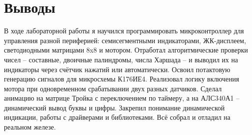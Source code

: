 \documentclass[oneside,a4paper,14pt]{extarticle} %
\begin{document}
	\section*{Выводы}
	В ходе лабораторной работы я научился программировать микроконтроллер для управления разной периферией: семисегментными индикаторами, ЖК-дисплеем, светодиодными матрицами 8x8 и мотором. Отработал алгоритмические проверки чисел – составные, двоичные палиндромы, числа Харшада – и выводил их на индикаторы через счётчик нажатий или автоматически. Освоил потактовую генерацию сигналов для микросхемы К176ИЕ4. Реализовал логику включения мотора при одновременном срабатывании двух разных датчиков. Сделал анимацию на матрице Тройка с переключением по таймеру, а на АЛС340А1 – динамический вывод буквы и цифры. Закрепил понимание динамической индикации, работы с драйверами и библиотеками. Всё собрал и отладил на реальном железе.
\end{document}
